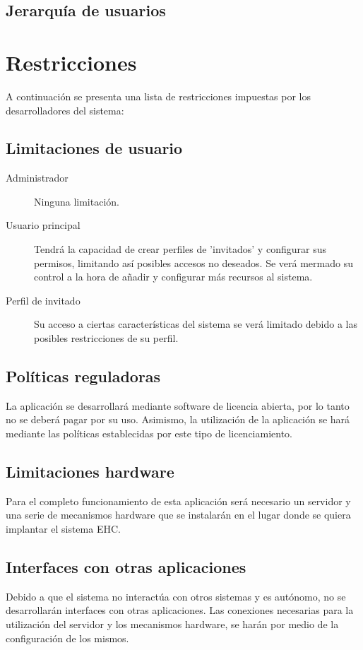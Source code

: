     \subsection{Jerarquía de usuarios}

\section{Restricciones}
    A continuación se presenta una lista de restricciones impuestas por los desarrolladores del sistema:

    \subsection{Limitaciones de usuario}
        \begin{description}
            \item[Administrador] Ninguna limitación.

            \item[Usuario principal] Tendrá la capacidad de crear perfiles de 'invitados' y configurar sus permisos, limitando así posibles accesos no deseados. Se verá mermado su control a la hora de a\~nadir y configurar más recursos al sistema.

            \item[Perfil de invitado] Su acceso a ciertas características del sistema se verá limitado debido a las posibles restricciones de su perfil.
        \end{description}

    \subsection{Políticas reguladoras}
        La aplicación se desarrollará mediante software de licencia abierta, por lo tanto no se deberá pagar por su uso. Asimismo, la utilización de la aplicación se hará mediante las políticas establecidas por este tipo de licenciamiento.

    \subsection{Limitaciones hardware}
        Para el completo funcionamiento de esta aplicación será necesario un servidor y una serie de mecanismos hardware que se instalarán en el lugar donde se quiera implantar el sistema EHC.

    \subsection{Interfaces con otras aplicaciones}
        Debido a que el sistema no interactúa con otros sistemas y es autónomo, no se desarrollarán interfaces con otras aplicaciones. Las conexiones necesarias para la utilización del servidor y los mecanismos hardware, se harán por medio de la configuración de los mismos.


